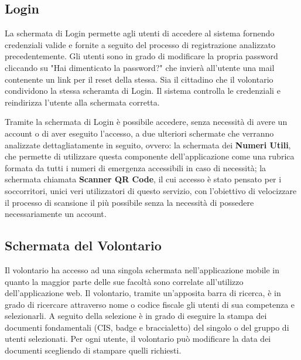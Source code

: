 \documentclass[12pt,a4paper,twoside,openright,titlepage]{book}
\begin{document}
\subsection{Login}
La schermata di Login permette agli utenti di accedere al sistema fornendo credenziali valide e fornite a seguito del processo di registrazione analizzato precedentemente. Gli utenti sono in grado di modificare la propria password cliccando su "Hai dimenticato la password?" che invierà all'utente una mail contenente un link per il reset della stessa. Sia il cittadino che il volontario condividono la stessa scheramta di Login. Il sistema controlla le credenziali e reindirizza l'utente alla schermata corretta.\newline

Tramite la schermata di Login è possibile accedere, senza necessità di avere un account o di aver eseguito l'accesso, a due ulteriori schermate che verranno analizzate dettagliatamente in seguito, ovvero: la schermata dei \textbf{Numeri Utili}, che permette di utilizzare questa componente dell'applicazione come una rubrica formata da tutti i numeri di emergenza accessibili in caso di necessità;
la schermata chiamata \textbf{Scanner QR Code}, il cui accesso è stato pensato per i soccorritori, unici veri utilizzatori di questo servizio, con l'obiettivo di velocizzare il processo di scansione il più possibile senza la necessità di possedere necessariamente un account.

\subsection{Schermata del Volontario}
Il volontario ha accesso ad una singola schermata nell'applicazione mobile in quanto la maggior parte delle sue facoltà sono correlate all'utilizzo dell'applicazione web. Il volontario, tramite un'apposita barra di ricerca, è in grado di ricercare attraverso nome o codice fiscale gli utenti di sua competenza e selezionarli. A seguito della selezione è in grado di eseguire la stampa dei documenti fondamentali (CIS, badge e braccialetto) del singolo o del gruppo di utenti selezionati. Per ogni utente, il volontario può modificare la data dei documenti scegliendo di stampare quelli richiesti.
\end{document}

